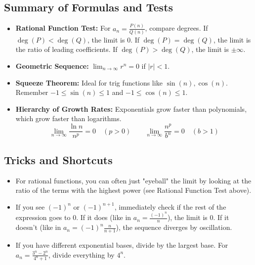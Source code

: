 \documentclass{article}
\begin{document}
\subsection{Summary of Formulas and Tests}
\begin{itemize}
    \item \textbf{Rational Function Test:} For $a_n = \frac{P(n)}{Q(n)}$, compare degrees. If $\deg(P) < \deg(Q)$, the limit is 0. If $\deg(P) = \deg(Q)$, the limit is the ratio of leading coefficients. If $\deg(P) > \deg(Q)$, the limit is $\pm\infty$.
    \item \textbf{Geometric Sequence:} $\lim_{n \to \infty} r^n = 0$ if $|r|<1$.
    \item \textbf{Squeeze Theorem:} Ideal for trig functions like $\sin(n), \cos(n)$. Remember $-1 \le \sin(n) \le 1$ and $-1 \le \cos(n) \le 1$.
    \item \textbf{Hierarchy of Growth Rates:} Exponentials grow faster than polynomials, which grow faster than logarithms.
    \[ \lim_{n \to \infty} \frac{\ln n}{n^p} = 0 \quad (p>0) \qquad \lim_{n \to \infty} \frac{n^p}{b^n} = 0 \quad (b>1) \]
\end{itemize}

\subsection{Tricks and Shortcuts}
\begin{itemize}
    \item For rational functions, you can often just "eyeball" the limit by looking at the ratio of the terms with the highest power (see Rational Function Test above).
    \item If you see $(-1)^n$ or $(-1)^{n+1}$, immediately check if the rest of the expression goes to 0. If it does (like in $a_n = \frac{(-1)^n}{n}$), the limit is 0. If it doesn't (like in $a_n = (-1)^n \frac{n}{n+1}$), the sequence diverges by oscillation.
    \item If you have different exponential bases, divide by the largest base. For $a_n = \frac{3^n - 2^n}{4^n+1}$, divide everything by $4^n$.
\end{itemize}
\end{document}
